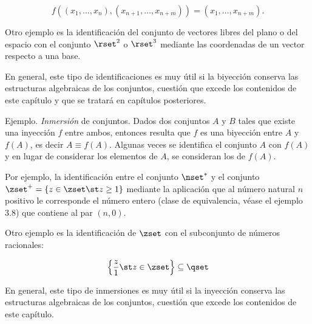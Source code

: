 $$ f((x_1, \ldots, x_n), (x_{n+1}, \ldots, x_{n+m})) = (x_1, \ldots,
x_{n+m}). $$

Otro ejemplo es la identificación del conjunto de vectores libres del plano
o del espacio con el conjunto $\rset^2$ o $\rset^3$ mediante las coordenadas
de un vector respecto a una base.

En general, este tipo de identificaciones es muy útil si la biyección
conserva las estructuras algebraicas de los conjuntos, cuestión que excede
los contenidos de este capítulo y que se tratará en capítulos posteriores.

Ejemplo. \emph{Inmersión} de conjuntos. Dados dos conjuntos $A$ y $B$ tales
que existe una inyección $f$ entre ambos, entonces resulta que $f$ es una
biyección entre $A$ y $f(A)$, es decir $A \equiv f(A)$. Algunas veces se
identifica el conjunto $A$ con $f(A)$ y en lugar de considerar los elementos
de $A$, se consideran los de $f(A)$.

Por ejemplo, la identificación entre el conjunto $\nset^*$ y el conjunto
$\zset^+ = \{z \in \zset \st z \geq 1\}$ mediante la aplicación que al
número natural $n$ positivo le corresponde el número entero (clase de
equivalencia, véase el ejemplo 3.8) que contiene al par $(n, 0)$.

Otro ejemplo es la identificación de $\zset$ con el subconjunto de números
racionales:

$$ \left\{\frac{z}{1} \st z \in \zset\right\} \subseteq \qset $$

En general, este tipo de inmersiones es muy útil si la inyección conserva
las estructuras algebraicas de los conjuntos, cuestión que excede los
contenidos de este capítulo.























